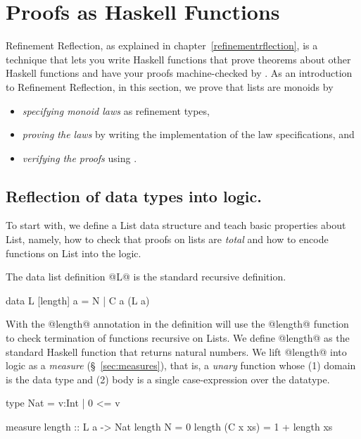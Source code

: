 \section{Proofs as Haskell Functions}\label{sec:haskell-proofs}

Refinement Reflection, as explained in chapter~\ref{refinementrflection}, is a technique
that lets you write Haskell functions that prove theorems
about other Haskell functions and have your proofs machine-checked
by \toolname.
%
As an introduction to Refinement Reflection,
in this section, we prove that lists are monoids by
\begin{itemize}
\item \textit{specifying monoid laws} as refinement types,
\item \textit{proving the laws} by writing the implementation of the law specifications, and
\item \textit{verifying the proofs} using \toolname.
\end{itemize}

\subsection{Reflection of data types into logic.}
To start with,
we define a List data structure and
teach \toolname basic properties about List,
namely, how to check that proofs on lists are \textit{total}
and how to encode functions on List into the logic.

The data list definition @L@ is the standard recursive definition.
\begin{code}
  data L [length] a = N | C a (L a)
\end{code}
%
With the @length@ annotation in the definition \toolname
will use the @length@ function to check termination
of functions recursive on Lists.
%
We define @length@ as the standard Haskell function
that returns natural numbers.
%
We lift @length@ into logic as a \textit{measure} (\S~\ref{sec:measures}),
that is, a \textit{unary} function whose (1) domain is the data type and
(2) body is a single case-expression over the datatype.
\begin{code}
  type Nat = {v:Int | 0 <= v}

  measure length    :: L a -> Nat
    length N        = 0
    length (C x xs) = 1 + length xs
\end{code}

